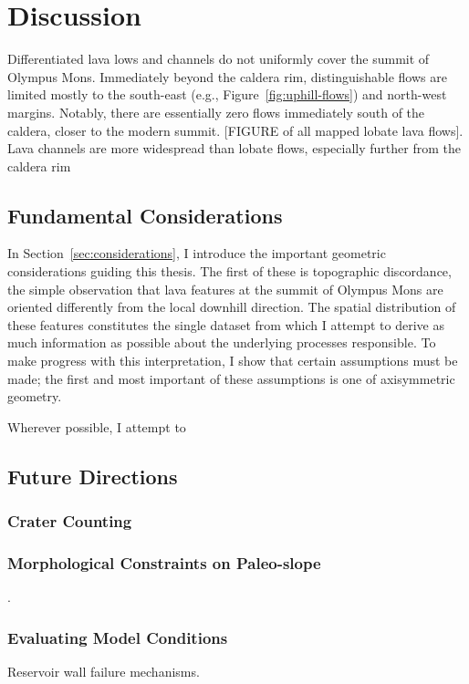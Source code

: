 \chapter{Discussion}\label{cha:discussion}

Differentiated lava lows and channels do not uniformly cover the summit of Olympus Mons. Immediately beyond the caldera rim, distinguishable flows are limited mostly to the south-east (e.g., Figure~\ref{fig:uphill-flows}) and north-west margins. Notably, there are essentially zero flows immediately south of the caldera, closer to the modern summit. [FIGURE of all mapped lobate lava flows]. Lava channels are more widespread than lobate flows, especially further from the caldera rim 

\section{Fundamental Considerations}

In Section~\ref{sec:considerations}, I introduce the important geometric considerations guiding this thesis. The first of these is topographic discordance, the simple observation that lava features at the summit of Olympus Mons are oriented differently from the local downhill direction. The spatial distribution of these features constitutes the single dataset from which I attempt to derive as much information as possible about the underlying processes responsible. To make progress with this interpretation, I show that certain assumptions must be made; the first and most important of these assumptions is one of axisymmetric geometry.

Wherever possible, I attempt to 

\section{Future Directions}

\subsection{Crater Counting}
\textcite{kneissl_map-projection-independent_2011,robbins_volcanic_2011,
robbins_large_2013,
platz_crater-based_2013}

\subsection{Morphological Constraints on Paleo-slope}
\textcite{wadge_lobes_1991, peitersen_correlations_2000, peters_lava_2021}.

\subsection{Evaluating Model Conditions}

Reservoir wall failure mechanisms.

